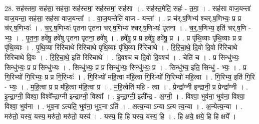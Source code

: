 \documentclass[17pt]{extarticle}
\begin{document}
28. सह॑स्तमा॒ सह॑सा॒ सह॑सा॒ सह॑स्तमा॒ सह॑स्तमा॒ सह॑सा । . सह॑स्त॒मेति॒ सहः॑ - त॒मा॒ । . सह॑सा वाज॒यन्ता॑ वाज॒यन्ता॒ सह॑सा॒ सह॑सा वाज॒यन्ता᳚ । . वा॒ज॒यन्तेति॑ वाज - यन्ता᳚ । . प्र च॑र्.ष॒णिभ्य॑ श्चर्.ष॒णिभ्यः॒ प्र प्र च॑र्.ष॒णिभ्यः॑ । . च॒र्॒.ष॒णिभ्यः॑ पृतना पृतना चर्.ष॒णिभ्य॑ श्चर्.ष॒णिभ्यः॑ पृतना । . च॒र्॒.ष॒णिभ्य॒ इति॑ चर्.ष॒णि - भ्यः॒ । . पृ॒त॒ना॒ हवे॑षु॒ हवे॑षु पृतना पृतना॒ हवे॑षु । . हवे॑षु॒ प्र प्र हवे॑षु॒ हवे॑षु॒ प्र । . प्र पृ॑थि॒व्याः पृ॑थि॒व्याः प्र प्र पृ॑थि॒व्याः । . पृ॒थि॒व्या रि॑रिचाथे रिरिचाथे पृथि॒व्याः पृ॑थि॒व्या रि॑रिचाथे । . रि॒रि॒चा॒थे॒ दि॒वो दि॒वो रि॑रिचाथे रिरिचाथे दि॒वः । . रि॒रि॒चा॒थे॒ इति॑ रिरिचाथे । . दि॒वश्च॑ च दि॒वो दि॒वश्च॑ । . चेति॑ च । . प्र सिन्धु॑भ्यः॒ सिन्धु॑भ्यः॒ प्र प्र सिन्धु॑भ्यः । . सिन्धु॑भ्यः॒ प्र प्र सिन्धु॑भ्यः॒ सिन्धु॑भ्यः॒ प्र । . सिन्धु॑भ्य॒ इति॒ सिन्धु॑ - भ्यः॒ । . प्र गि॒रिभ्यो॑ गि॒रिभ्यः॒ प्र प्र गि॒रिभ्यः॑ । . गि॒रिभ्यो॑ महि॒त्वा म॑हि॒त्वा गि॒रिभ्यो॑ गि॒रिभ्यो॑ महि॒त्वा । . गि॒रिभ्य॒ इति॑ गि॒रि - भ्यः॒ । . म॒हि॒त्वा प्र प्र म॑हि॒त्वा म॑हि॒त्वा प्र । . म॒हि॒त्वेति॑ महि - त्वा । . प्रेन्द्रा᳚ग्नी इन्द्रानी॒ प्र प्रेन्द्रा᳚ग्नी । . इ॒न्द्रा॒ग्नी॒ विश्वा॒ विश्वे᳚न्द्राग्नी इन्द्राग्नी॒ विश्वा᳚ । . इ॒न्द्रा॒ग्नी॒ इती᳚न्द्र - अ॒ग्नी॒ । . विश्वा॒ भुव॑ना॒ भुव॑ना॒ विश्वा॒ विश्वा॒ भुव॑ना । . भुव॒ना ऽत्यति॒ भुव॑ना॒ भुव॒ना ऽति॑ । . अत्य॒न्या ऽन्या ऽत्य त्य॒न्या । . अ॒न्येत्य॒न्या । . मरु॑तो॒ यस्य॒ यस्य॒ मरु॑तो॒ मरु॑तो॒ यस्य॑ । . यस्य॒ हि हि यस्य॒ यस्य॒ हि । . हि क्षये॒ क्षये॒ हि हि क्षये᳚ । \newline
\end{document}
